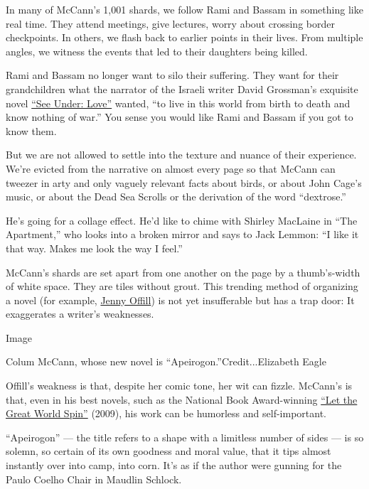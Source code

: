 In many of McCann's 1,001 shards, we follow Rami and Bassam in something
like real time. They attend meetings, give lectures, worry about
crossing border checkpoints. In others, we flash back to earlier points
in their lives. From multiple angles, we witness the events that led to
their daughters being killed.

Rami and Bassam no longer want to silo their suffering. They want for
their grandchildren what the narrator of the Israeli writer David
Grossman's exquisite novel
\href{https://www.nytimes3xbfgragh.onion/1989/04/04/books/books-of-the-times-wrestling-with-the-beast-of-the-holocaust.html}{``See
Under: Love''} wanted, ``to live in this world from birth to death and
know nothing of war.'' You sense you would like Rami and Bassam if you
got to know them.

But we are not allowed to settle into the texture and nuance of their
experience. We're evicted from the narrative on almost every page so
that McCann can tweezer in arty and only vaguely relevant facts about
birds, or about John Cage's music, or about the Dead Sea Scrolls or the
derivation of the word ``dextrose.''

He's going for a collage effect. He'd like to chime with Shirley
MacLaine in ``The Apartment,'' who looks into a broken mirror and says
to Jack Lemmon: ``I like it that way. Makes me look the way I feel.''

McCann's shards are set apart from one another on the page by a
thumb's-width of white space. They are tiles without grout. This
trending method of organizing a novel (for example,
\href{https://www.nytimes3xbfgragh.onion/2020/01/31/books/review-weather-jenny-offill.html}{Jenny
Offill}) is not yet insufferable but has a trap door: It exaggerates a
writer's weaknesses.

Image

Colum McCann, whose new novel is ``Apeirogon.''Credit...Elizabeth Eagle

Offill's weakness is that, despite her comic tone, her wit can fizzle.
McCann's is that, even in his best novels, such as the National Book
Award-winning
\href{https://www.nytimes3xbfgragh.onion/2009/08/02/books/review/Mahler-t.html}{``Let
the Great World Spin''} (2009), his work can be humorless and
self-important.

``Apeirogon'' --- the title refers to a shape with a limitless number of
sides --- is so solemn, so certain of its own goodness and moral value,
that it tips almost instantly over into camp, into corn. It's as if the
author were gunning for the Paulo Coelho Chair in Maudlin Schlock.

